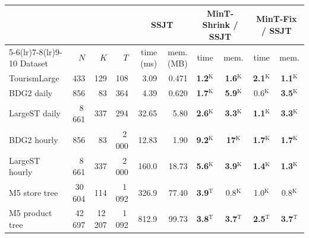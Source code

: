\footnotesize\setlength{\tabcolsep}{4pt}
\begin{tabular}{l rrr rr cc cc}
\toprule
 & & & & \multicolumn{2}{c}{SSJT} & \multicolumn{2}{c}{MinT-Shrink / SSJT} & \multicolumn{2}{c}{MinT-Fix / SSJT}\\
\cmidrule(lr){5-6}\cmidrule(lr){7-8}\cmidrule(lr){9-10}
Dataset & $N$ & $K$ & $T$ & time (ms) & mem. (MB) & time & mem. & time & mem.\\
\midrule
TourismLarge & 433 & 129 & 108 & 3.09 & 0.471 & \textbf{1.2}$^{\mathrm{K}}$ & \textbf{1.6}$^{\mathrm{K}}$ & \textbf{2.1}$^{\mathrm{K}}$ & \textbf{1.1}$^{\mathrm{K}}$\\
BDG2 daily & 856 & 83 & 364 & 4.39 & 0.620 & \textbf{1.7}$^{\mathrm{K}}$ & \textbf{5.9}$^{\mathrm{K}}$ & 0.6$^{\mathrm{K}}$ & \textbf{3.5}$^{\mathrm{K}}$\\
LargeST daily & 8\,661 & 337 & 294 & 32.65 & 5.80 & \textbf{2.6}$^{\mathrm{K}}$ & \textbf{3.3}$^{\mathrm{K}}$ & \textbf{1.1}$^{\mathrm{K}}$ & \textbf{3.3}$^{\mathrm{K}}$\\
BDG2 hourly & 856 & 83 & 2\,000 & 12.83 & 1.90 & \textbf{9.2}$^{\mathrm{K}}$ & \textbf{17}$^{\mathrm{K}}$ & \textbf{1.7}$^{\mathrm{K}}$ & \textbf{1.7}$^{\mathrm{K}}$\\
LargeST hourly & 8\,661 & 337 & 2\,000 & 160.0 & 18.73 & \textbf{5.6}$^{\mathrm{K}}$ & \textbf{3.9}$^{\mathrm{K}}$ & \textbf{1.4}$^{\mathrm{K}}$ & \textbf{1.3}$^{\mathrm{K}}$\\
M5 store tree & 30\,604 & 114 & 1\,092 & 326.9 & 77.40 & \textbf{3.9}$^{\mathrm{T}}$ & 0.8$^{\mathrm{K}}$ & 1.0$^{\mathrm{K}}$ & 0.8$^{\mathrm{K}}$\\
M5 product tree & 42\,697 & 12\,207 & 1\,092 & 812.9 & 99.73 & \textbf{3.8}$^{\mathrm{T}}$ & \textbf{3.7}$^{\mathrm{T}}$ & \textbf{2.5}$^{\mathrm{T}}$ & \textbf{3.7}$^{\mathrm{T}}$\\
\bottomrule
\end{tabular}
